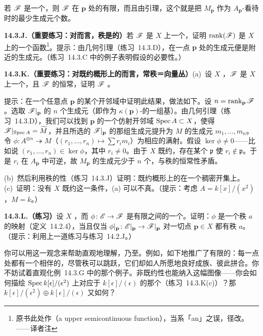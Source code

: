 若 $\mathscr{F}$ 是一个\trFiniteType{}\trQCSheaf，则 $\mathscr{F}$ 在 $\mathbf{p}$ 处的\trRank{}有限，而且由\trNakayama{}引理，这个\trRank{}就是把 $M_{\mathbf{p}}$ 作为 $A_{\mathbf{p}}$-\trModule{}看待时的最少生成元个数。

\textbf{14.3.J.（重要练习：对\trFiniteType{}\trQCSheaf{}而言，秩是\trUpperSemicontinuous{}的）}\quad 若 $\mathscr{F}$ 是 $X$ 上一个\trFiniteType{}\trQCSheaf，证明 $\operatorname{rank}(\mathscr{F})$ 是 $X$ 上的一个\trUpperSemicontinuous{}函数\footnote{原书此处作（a upper semicontinuous function），当系「an」之误，径改。——译者注}。提示：由几何\trNakayama{}引理（\mbox{练习~14.3.D}），在一点 $\mathbf{p}$ 处的生成元便是附近的生成元。（\mbox{练习~14.3.C} 中的例子表明\trFiniteType{}假设的必要性。）

\textbf{14.3.K.（重要练习：对既约概形上的\trFiniteType{}\trQCSheaf{}而言，常秩＝向量丛）}\quad (a)~设 $X$ \trReduced，$\mathscr{F}$ 是 $X$ 上一个\trFiniteType{}\trQCSheaf，且 $\mathscr{F}$ 的\trRank{}恒常，证明 $\mathscr{F}$ \trLocallyFree。

提示：在一个任意点 $\mathbf{p}$ 的某个开邻域中证明此结果，做法如下。设 $n=\operatorname{rank}_{\mathbf{p}}\mathscr{F}$。选取\trFiber{} $\mathscr{F}|_{\mathbf{p}}$ 的 $n$ 个生成元（即作为 $\kappa(\mathbf{p})$-\trVectorSpace{}的一组基）。由几何\trNakayama{}引理（\mbox{练习~14.3.D}），我们可以找到 $\mathbf{p}$ 的一个仿射开邻域 $\operatorname{Spec} A\subset X$，使得 $\mathscr{F}|_{\operatorname{Spec} A}=\widetilde{M}$，并且所选的 $\mathscr{F}|_{\mathbf{p}}$ 的那组生成元提升为 $M$ 的生成元 $m_1,\dots,m_n$。令 $\phi\colon A^{\oplus n}\twoheadrightarrow M$（$(r_1,\dots,r_n)\mapsto\sum r_i m_i$）为相应的满射。假设 $\ker\phi\neq 0$——比如说 $(r_1,\dots,r_n)\in\ker\phi$，其中 $r_i\neq 0$。由于 $X$ 既约，存在某个 $\mathfrak{p}$ 使 $r_i\notin\mathfrak{p}$。于是 $r_i$ 在 $A_{\mathbf{p}}$ 中可逆，故 $M_{\mathbf{p}}$ 的生成元少于 $n$ 个，与秩的恒常性矛盾。

(b)~然后利用秩的\trUpperSemicontinuous{}性（\mbox{练习~14.3.J}）证明：既约概形上的\trFiniteType{}\trQCSheaf{}在一个稠密开集上\trLocallyFree。(c)~证明：没有 $X$ 既约这一条件，(a) 可以不真。（提示：考虑 $A=k[x]/(x^2)$，$M=k$。）

\textbf{14.3.L.（练习）}\quad 设 $X$ \trReduced，而 $\phi\colon\mathscr{E}\to\mathscr{F}$ 是有限\trRank{}\trLocallyFreeSheaf{}之间的一个\trMorphism。证明：$\phi$ 是一个秩 $a$ 的\trVectorBundle{}映射（定义~14.2.4），当且仅当 $\phi|_{\mathbf{p}}\colon\mathscr{E}|_{\mathbf{p}}\to\mathscr{F}|_{\mathbf{p}}$ 对一切点 $\mathbf{p}\in X$ 都有秩 $a$。（提示：利用上一道练习与\mbox{练习~14.2.J}。）

你可以用\trRank{}这一观念来帮助直观地理解\trFiniteType{}\trQCSheaf，乃至\trQCSheaf。例如，\trFiniteType{}\trQCSheaf{}如下地推广了有限\trRank{}的\trVectorBundle：每一点处都有一个相伴的\trVectorSpace，尽管秩可以跳跃，它们却如人所愿地良好成族、彼此拼合。你不妨试着直观化例~14.3.G 中的那个例子。非既约性也能纳入这幅图像——你会如何描绘 $\operatorname{Spec} k[\epsilon]/(\epsilon^2)$ 上对应于 $k[\epsilon]/(\epsilon)$ 的那个\trCoherentSheaf（\mbox{练习~14.3.K(c)}）？那 $k[\epsilon]/(\epsilon^2)\oplus k[\epsilon]/(\epsilon)$ 又如何？

